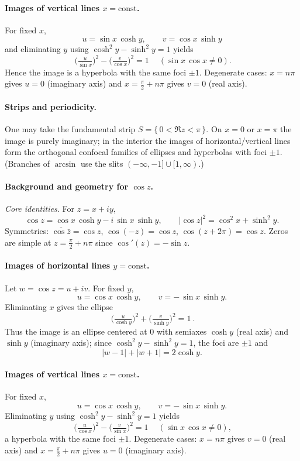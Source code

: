 \documentclass[11pt,a4paper]{article}
\theoremstyle{definition}
\theoremstyle{definition}
\theoremstyle{plain}
\theoremstyle{remark}
\begin{document}
\medskip
\paragraph{Images of vertical lines $x=\text{const}$.}
For fixed $x$,
\[
u=\sin x\,\cosh y,\qquad v=\cos x\,\sinh y
\]
and eliminating $y$ using $\cosh^{2}y-\sinh^{2}y=1$ yields
\[
\boxed{\ \Big(\tfrac{u}{\sin x}\Big)^{2}-\Big(\tfrac{v}{\cos x}\Big)^{2}=1\ } \quad
(\sin x\,\cos x\ne0).
\]
Hence the image is a hyperbola with the same foci $\pm1$.
Degenerate cases:
$x=n\pi$ gives $u=0$ (imaginary axis) and $x=\frac{\pi}{2}+n\pi$ gives $v=0$ (real axis).

\medskip
\paragraph{Strips and periodicity.}
One may take the fundamental strip $S=\{\,0<\Re z<\pi\,\}$. On $x=0$ or $x=\pi$
the image is purely imaginary; in the interior the images of horizontal/vertical lines
form the orthogonal confocal families of ellipses and hyperbolas with foci $\pm1$.
(Branches of $\arcsin$ use the slits $(-\infty,-1]\cup[1,\infty)$.)


\paragraph{Background and geometry for $\cos z$.}

\emph{Core identities.} For $z=x+iy$,
\[
\cos z=\cos x\,\cosh y - i\,\sin x\,\sinh y,\qquad
|\cos z|^{2}=\cos^{2}x+\sinh^{2}y.
\]
Symmetries: $\overline{\cos\bar z}=\cos z$, $\cos(-z)=\cos z$, $\cos(z+2\pi)=\cos z$.
Zeros are simple at $z=\tfrac{\pi}{2}+n\pi$ since $\cos'(z)=-\sin z$.

\medskip
\paragraph{Images of horizontal lines $y=\text{const}$.}
Let $w=\cos z=u+iv$. For fixed $y$,
\[
u=\cos x\,\cosh y,\qquad v=-\,\sin x\,\sinh y.
\]
Eliminating $x$ gives the ellipse
\[
\boxed{\ \Big(\tfrac{u}{\cosh y}\Big)^{2}+\Big(\tfrac{v}{\sinh y}\Big)^{2}=1\ }.
\]
Thus the image is an ellipse centered at $0$ with semiaxes $\cosh y$ (real axis) and $\sinh y$ (imaginary axis); since $\cosh^{2}y-\sinh^{2}y=1$, the foci are $\pm1$ and
\[
|w-1|+|w+1|=2\cosh y.
\]

\medskip
\paragraph{Images of vertical lines $x=\text{const}$.}
For fixed $x$,
\[
u=\cos x\,\cosh y,\qquad v=-\,\sin x\,\sinh y.
\]
Eliminating $y$ using $\cosh^{2}y-\sinh^{2}y=1$ yields
\[
\boxed{\ \Big(\tfrac{u}{\cos x}\Big)^{2}-\Big(\tfrac{v}{\sin x}\Big)^{2}=1\ } \quad
(\sin x\,\cos x\ne0),
\]
a hyperbola with the same foci $\pm1$.
Degenerate cases:
$x=n\pi$ gives $v=0$ (real axis) and $x=\tfrac{\pi}{2}+n\pi$ gives $u=0$ (imaginary axis).
\end{document}
